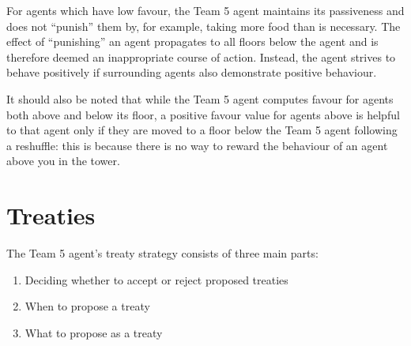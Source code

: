 For agents which have low favour, the Team 5 agent maintains its passiveness and does not ``punish'' them by, for example, taking more food than is necessary. The effect of ``punishing'' an agent propagates to all floors below the agent and is therefore deemed an inappropriate course of action. Instead, the agent strives to behave positively if surrounding agents also demonstrate positive behaviour.

It should also be noted that while the Team 5 agent computes favour for agents both above and below its floor, a positive favour value for agents above is helpful to that agent only if they are moved to a floor below the Team 5 agent following a reshuffle: this is because there is no way to reward the behaviour of an agent above you in the tower.

\section{Treaties}\label{sec:team5-treaties}
The Team 5 agent's treaty strategy consists of three main parts:
\begin{enumerate}
    \item Deciding whether to accept or reject proposed treaties
    \item When to propose a treaty
    \item What to propose as a treaty
\end{enumerate}


